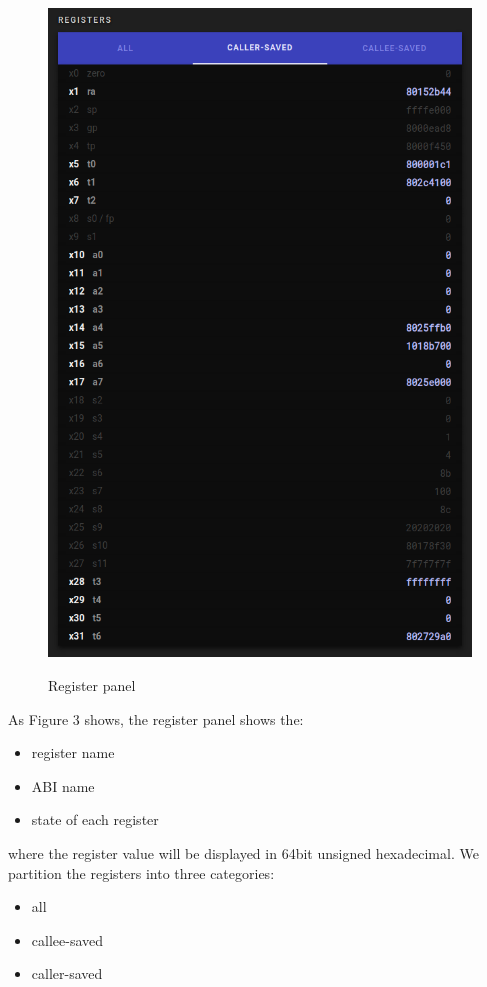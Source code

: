\begin{figure}[H]
  \includegraphics[scale=.35]{reg}
  \label{fig:reg}
  \caption{Register panel}
  \centering
\end{figure}

\noindent

As Figure 3 shows, the register panel shows the:
\begin{itemize}
  \item register name
  \item ABI name
  \item state of each register
\end{itemize}
where the register value will be displayed in 64bit unsigned hexadecimal.
\newpage
We partition the registers into three categories:
\begin{itemize}
  \item all
  \item callee-saved
  \item caller-saved
\end{itemize}

